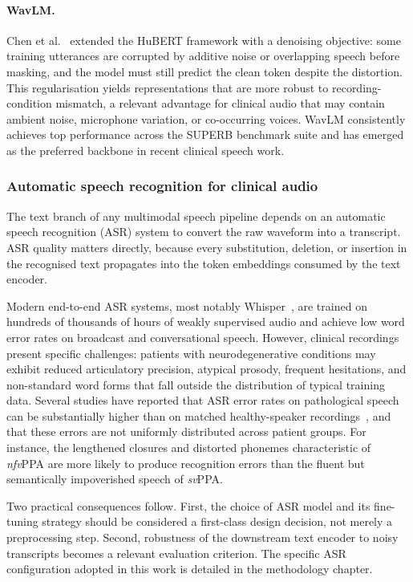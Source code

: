 \paragraph{WavLM.}
Chen et al.~\cite{chen2022wavlm} extended the HuBERT framework with a denoising objective: some training utterances are corrupted by additive noise or overlapping speech before masking, and the model must still predict the clean token despite the distortion.
This regularisation yields representations that are more robust to recording-condition mismatch, a relevant advantage for clinical audio that may contain ambient noise, microphone variation, or co-occurring voices.
WavLM consistently achieves top performance across the SUPERB benchmark suite and has emerged as the preferred backbone in recent clinical speech work.

\subsubsection{Automatic speech recognition for clinical audio}
\label{ssec:asr}

The text branch of any multimodal speech pipeline depends on an automatic speech recognition (ASR) system to convert the raw waveform into a transcript.
ASR quality matters directly, because every substitution, deletion, or insertion in the recognised text propagates into the token embeddings consumed by the text encoder.

Modern end-to-end ASR systems, most notably Whisper~\cite{radford2023whisper}, are trained on hundreds of thousands of hours of weakly supervised audio and achieve low word error rates on broadcast and conversational speech.
However, clinical recordings present specific challenges: patients with neurodegenerative conditions may exhibit reduced articulatory precision, atypical prosody, frequent hesitations, and non-standard word forms that fall outside the distribution of typical training data.
Several studies have reported that ASR error rates on pathological speech can be substantially higher than on matched healthy-speaker recordings~\cite{ding2024speechsurvey}, and that these errors are not uniformly distributed across patient groups.
For instance, the lengthened closures and distorted phonemes characteristic of \textit{nfv}PPA are more likely to produce recognition errors than the fluent but semantically impoverished speech of \textit{sv}PPA.

Two practical consequences follow.
First, the choice of ASR model and its fine-tuning strategy should be considered a first-class design decision, not merely a preprocessing step.
Second, robustness of the downstream text encoder to noisy transcripts becomes a relevant evaluation criterion.
The specific ASR configuration adopted in this work is detailed in the methodology chapter.

